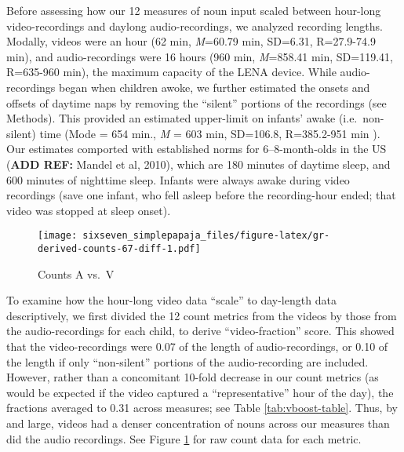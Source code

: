 \documentclass[floatsintext,man]{apa6}
\theoremstyle{definition}
\theoremstyle{definition}
\theoremstyle{definition}
\theoremstyle{remark}
\begin{document}
Before assessing how our 12 measures of noun input scaled between
hour-long video-recordings and daylong audio-recordings, we analyzed
recording lengths. Modally, videos were an hour (62 min, \emph{M}=60.79
min, SD=6.31, R=27.9-74.9 min), and audio-recordings were 16 hours (960
min, \emph{M}=858.41 min, SD=119.41, R=635-960 min), the maximum
capacity of the LENA device. While audio-recordings began when children
awoke, we further estimated the onsets and offsets of daytime naps by
removing the \enquote{silent} portions of the recordings (see Methods).
This provided an estimated upper-limit on infants' awake
(i.e.~non-silent) time (Mode = 654 min., \emph{M} = 603 min, SD=106.8,
R=385.2-951 min ). Our estimates comported with established norms for
6--8-month-olds in the US (\textbf{ADD REF:} Mandel et al, 2010), which
are 180 minutes of daytime sleep, and 600 minutes of nighttime sleep.
Infants were always awake during video recordings (save one infant, who
fell asleep before the recording-hour ended; that video was stopped at
sleep onset).

\begin{figure}
\centering
\texttt{[image: sixseven\_simplepapaja\_files/figure-latex/gr-derived-counts-67-diff-1.pdf]}
\caption{\label{fig:gr-derived-counts-67-diff}Counts A vs.~V}
\end{figure}

To examine how the hour-long video data \enquote{scale} to day-length
data descriptively, we first divided the 12 count metrics from the
videos by those from the audio-recordings for each child, to derive
\enquote{video-fraction} score. This showed that the video-recordings
were 0.07 of the length of audio-recordings, or 0.10 of the length if
only \enquote{non-silent} portions of the audio-recording are included.
However, rather than a concomitant 10-fold decrease in our count metrics
(as would be expected if the video captured a \enquote{representative}
hour of the day), the fractions averaged to 0.31 across measures; see
Table \ref{tab:vboost-table}. Thus, by and large, videos had a denser
concentration of nouns across our measures than did the audio
recordings. See Figure \ref{fig:gr-derived-counts-67-diff} for raw count
data for each metric.
\end{document}
